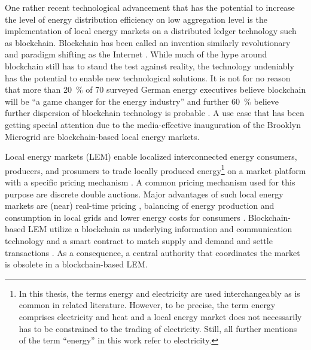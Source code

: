 One rather recent technological advancement that has the potential to increase the level of energy distribution efficiency on low aggregation level is the implementation of local energy markets on a distributed ledger technology such as blockchain. Blockchain has been called an invention similarly revolutionary and paradigm shifting as the Internet \citep{Swan:2015}. While much of the hype around blockchain still has to stand the test against reality, the technology undeniably has the potential to enable new technological solutions. It is not for no reason that more than 20~\% of 70 surveyed German energy executives believe blockchain will be “a game changer for the energy industry” and further 60~\% believe further dispersion of blockchain technology is probable \citep{Burger:2016}. A use case that has been getting special attention due to the media-effective inauguration of the Brooklyn Microgrid \citep{newscientist:2016} are blockchain-based local energy markets.

Local energy markets (LEM) enable localized interconnected energy consumers, producers, and prosumers to trade locally produced energy\footnote{In this thesis, the terms energy and electricity are used interchangeably as is common in related literature. However, to be precise, the term energy comprises electricity and heat and a local energy market does not necessarily has to be constrained to the trading of electricity. Still, all further mentions of the term ``energy'' in this work refer to electricity.} on a market platform with a specific pricing mechanism \citep{Mengelkamp:2018a}. A common pricing mechanism used for this purpose are discrete double auctions\citep{Lamparter:2010, Buchmann:2013, Block:2008}. Major advantages of such local energy markets are (near) real-time pricing \citep{Mihaylov:2014}, balancing of energy production and consumption in local grids \citep{Stadler:2016} and lower energy costs for consumers \citep{Mengelkamp:2018agentstrategies}. Blockchain-based LEM utilize a blockchain as underlying information and communication technology and a smart contract to match supply and demand and settle transactions \citep{Mengelkamp:2018b}. As a consequence, a central authority that coordinates the market is obsolete in a blockchain-based LEM.

